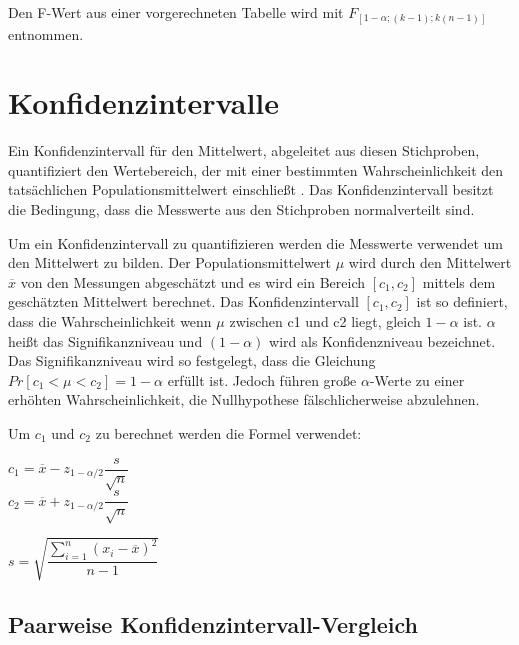 Den F-Wert aus einer vorgerechneten Tabelle wird mit $F_{[1-\alpha;(k-1);k(n-1)]}$ entnommen.

\section{Konfidenzintervalle}

Ein Konfidenzintervall für den Mittelwert, abgeleitet aus diesen Stichproben, quantifiziert den Wertebereich, 
der mit einer bestimmten Wahrscheinlichkeit den tatsächlichen Populationsmittelwert einschließt \cite{statistically_rigorous}.
Das Konfidenzintervall besitzt die Bedingung, dass die Messwerte aus den Stichproben normalverteilt sind.

Um ein Konfidenzintervall zu quantifizieren werden die Messwerte verwendet um den Mittelwert zu bilden.
Der Populationsmittelwert $\mu$ wird durch den Mittelwert $\overline{x}$ von den Messungen abgeschätzt
und es wird ein Bereich $[c_1,c_2]$ mittels dem geschätzten Mittelwert berechnet.
Das Konfidenzintervall $[c_1, c_2]$ ist so definiert, dass die Wahrscheinlichkeit
wenn $\mu$ zwischen c1 und c2 liegt, gleich $1 - \alpha$ ist. $\alpha$ heißt das
Signifikanzniveau und $(1 - \alpha)$ wird als Konfidenzniveau bezeichnet.
Das Signifikanzniveau wird so festgelegt, dass die Gleichung $Pr[c_1 < \mu < c_2] = 1 -\alpha$ erfüllt ist. 
Jedoch führen große $\alpha$-Werte zu einer erhöhten Wahrscheinlichkeit, die Nullhypothese fälschlicherweise abzulehnen.

Um $c_1$ und $c_2$ zu berechnet werden die Formel verwendet:

\begin{center}
         $c_1 = \overline{x} - z_{1-\alpha/2} \dfrac{s}{\sqrt{n}}$ \\
         $c_2 = \overline{x} + z_{1-\alpha/2} \dfrac{s}{\sqrt{n}}$ 

\end{center}


\begin{center}
         $s = \sqrt{\dfrac{\sum_{i=1}^{n} (x_i - \overline{x})^2}{n-1}}$ 
\end{center}

\subsection{Paarweise Konfidenzintervall-Vergleich}

